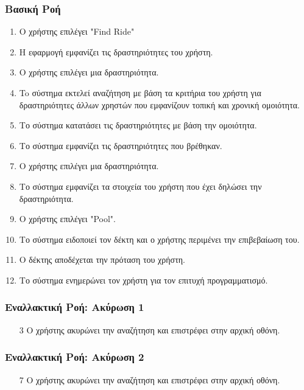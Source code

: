 \documentclass[11pt]{article}
\begin{document}
\subsubsection{Βασική Ροή}
\begin{enumerate}
    \item Ο χρήστης επιλέγει "Find Ride"
    \item Η εφαρμογή εμφανίζει τις δραστηριότητες του χρήστη.
    \item Ο χρήστης επιλέγει μια δραστηριότητα.
    \item To σύστημα εκτελεί αναζήτηση με βάση τα κριτήρια του χρήστη για δραστηριότητες
          άλλων χρηστών που εμφανίζουν τοπική και χρονική ομοιότητα.
    \item Το σύστημα κατατάσει τις δραστηριότητες με βάση την ομοιότητα.
    \item Το σύστημα εμφανίζει τις δραστηριότητες που βρέθηκαν.
    \item Ο χρήστης επιλέγει μια δραστηριότητα.
    \item Το σύστημα εμφανίζει τα στοιχεία του χρήστη που έχει δηλώσει την δραστηριότητα.
    \item Ο χρήστης επιλέγει "Pool".
    \item Το σύστημα ειδοποιεί τον δέκτη και ο χρήστης περιμένει την επιβεβαίωση του.
    \item O δέκτης αποδέχεται την πρόταση του χρήστη.
    \item Το σύστημα ενημερώνει τον χρήστη για τον επιτυχή προγραμματισμό.
\end{enumerate}

\subsubsection{Εναλλακτική Ροή: Ακύρωση 1}

\begin{enumerate}
    \item[3] Ο χρήστης ακυρώνει την αναζήτηση και επιστρέφει στην αρχική οθόνη.
\end{enumerate}

\subsubsection{Εναλλακτική Ροή: Ακύρωση 2}

\begin{enumerate}
    \item[7] Ο χρήστης ακυρώνει την αναζήτηση και επιστρέφει στην αρχική οθόνη.
\end{enumerate}
\end{document}
